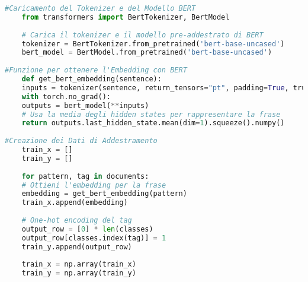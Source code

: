 \begin{lstlisting}[language=Python, caption=Utilizzo di Transformers nel codice]
#Caricamento del Tokenizer e del Modello BERT
	from transformers import BertTokenizer, BertModel
	
	# Carica il tokenizer e il modello pre-addestrato di BERT
	tokenizer = BertTokenizer.from_pretrained('bert-base-uncased')
	bert_model = BertModel.from_pretrained('bert-base-uncased')
	
#Funzione per ottenere l'Embedding con BERT
	def get_bert_embedding(sentence):
	inputs = tokenizer(sentence, return_tensors="pt", padding=True, truncation=True, max_length=50)
	with torch.no_grad():
	outputs = bert_model(**inputs)
	# Usa la media degli hidden states per rappresentare la frase
	return outputs.last_hidden_state.mean(dim=1).squeeze().numpy()
	
#Creazione dei Dati di Addestramento
	train_x = []
	train_y = []
	
	for pattern, tag in documents:
	# Ottieni l'embedding per la frase
	embedding = get_bert_embedding(pattern)
	train_x.append(embedding)
	
	# One-hot encoding del tag
	output_row = [0] * len(classes)
	output_row[classes.index(tag)] = 1
	train_y.append(output_row)
	
	train_x = np.array(train_x)
	train_y = np.array(train_y)
\end{lstlisting}